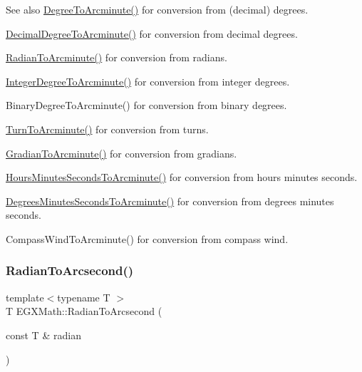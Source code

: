 \begin{DoxySeeAlso}{See also}
\mbox{\hyperlink{group___e_g_x_math-_angle_conversions-_degree_ga8abf327dc5f52907b2c881999e9cc43e}{Degree\+To\+Arcminute()}} for conversion from (decimal) degrees. 

\mbox{\hyperlink{group___e_g_x_math-_angle_conversions-_decimal_degree_ga6b6ea6e45d2a13f556824ca419cc9fbd}{Decimal\+Degree\+To\+Arcminute()}} for conversion from decimal degrees. 

\mbox{\hyperlink{group___e_g_x_math-_angle_conversions-_radian_ga722e3b8e78540a6b3942b73b64aeb8d2}{Radian\+To\+Arcminute()}} for conversion from radians. 

\mbox{\hyperlink{group___e_g_x_math-_angle_conversions-_integer_degree_ga78b014e7649d666a3647c467e64e4fe8}{Integer\+Degree\+To\+Arcminute()}} for conversion from integer degrees. 

Binary\+Degree\+To\+Arcminute() for conversion from binary degrees. 

\mbox{\hyperlink{group___e_g_x_math-_angle_conversions-_turn_ga72cda928d9043c7d82097b1a7920769e}{Turn\+To\+Arcminute()}} for conversion from turns. 

\mbox{\hyperlink{group___e_g_x_math-_angle_conversions-_gradian_ga67ef7daad49b0d73c39c52d426ab46a5}{Gradian\+To\+Arcminute()}} for conversion from gradians. 

\mbox{\hyperlink{group___e_g_x_math-_angle_conversions-_hours_minutes_seconds_ga23bfa5abeb014726c2e2ac6303be5dae}{Hours\+Minutes\+Seconds\+To\+Arcminute()}} for conversion from hours minutes seconds. 

\mbox{\hyperlink{group___e_g_x_math-_angle_conversions-_degrees_minutes_seconds_gadb8da2c4b9cdd4f618b6281314b1318c}{Degrees\+Minutes\+Seconds\+To\+Arcminute()}} for conversion from degrees minutes seconds. 

Compass\+Wind\+To\+Arcminute() for conversion from compass wind. 
\end{DoxySeeAlso}
\mbox{\label{group___e_g_x_math-_angle_conversions-_radian_ga2f952f6675a0fc54bf72bfe4e3d2664a}} 
\subsubsection{\texorpdfstring{Radian\+To\+Arcsecond()}{RadianToArcsecond()}}
{\footnotesize\ttfamily template$<$typename T $>$ \\
T E\+G\+X\+Math\+::\+Radian\+To\+Arcsecond (\begin{DoxyParamCaption}\item[{const T \&}]{radian }\end{DoxyParamCaption})}



